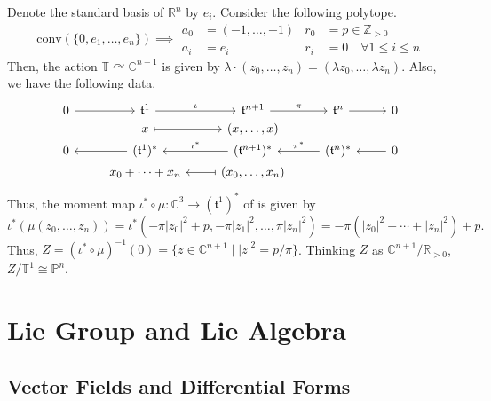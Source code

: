 \documentclass[b5paper,final]{article}
\newcommand{\acton}{\curvearrowright}
\begin{document}
\begin{example}{}
    Denote the standard basis of $\mathbb{R}^n$ by $e_i$. Consider the following polytope.
    \begin{equation*}
        \mathrm{conv}(\{ 0, e_1, \dots, e_n \})
        \implies
        \begin{aligned}
            a_0 &= (-1, \dots, -1) & r_0 &= p \in \mathbb{Z}_{>0} \\
            a_i &= e_i & r_i &= 0 \quad \forall 1 \leq i \leq n
        \end{aligned}
    \end{equation*}
    Then, the action $\mathbb{T} \acton \mathbb{C}^{n+1}$ is given by $\lambda \cdot (z_0, \dots, z_n) = (\lambda z_0, \dots, \lambda z_n)$. Also, we have the following data.
    \begin{equation*}
        \begin{tikzcd}[row sep=0ex]
            0 \arrow[r] & \mathfrak{t}^1 \arrow[r, "\iota"] & \mathfrak{t}^{n+1} \arrow[r, "\pi"] & \mathfrak{t}^n \arrow[r] & 0 \\
            {} & x \arrow[r, maps to] & (x, \dots, x) & {} & {} \\
            0 & (\mathfrak{t}^1)^* \arrow[l] & (\mathfrak{t}^{n+1})^* \arrow[l, "\iota^*"'] & (\mathfrak{t}^n)^* \arrow[l, "\pi^*"'] & 0 \arrow[l] \\
            {} & x_0 + \cdots + x_n & (x_0, \dots, x_n) \arrow[l, maps to] & {} & {}
        \end{tikzcd}
    \end{equation*}
    Thus, the moment map $\iota^* \circ \mu : \mathbb{C}^3 \to (\mathfrak{t}^1)^*$ of is given by
    \begin{equation*}
        \iota^*(\mu(z_0, \dots, z_n)) = \iota^*(-\pi|z_0|^2+p, -\pi|z_1|^2, \dots, \pi|z_n|^2) = -\pi(|z_0|^2+\cdots+|z_n|^2) + p.
    \end{equation*}
    Thus, $Z = (\iota^* \circ \mu)^{-1}(0) = \{ z \in \mathbb{C}^{n+1} \mid |z|^2 = p/\pi \}$. Thinking $Z$ as $\mathbb{C}^{n+1} / \mathbb{R}_{>0}$, $Z/\mathbb{T}^1 \cong \mathbb{P}^n$.
\end{example}

\section{Lie Group and Lie Algebra}

\subsection{Vector Fields and Differential Forms}
\end{document}
